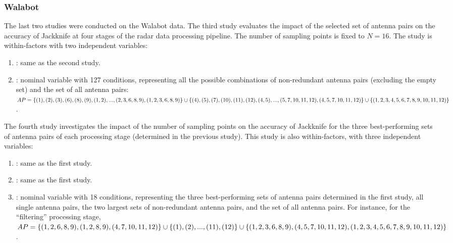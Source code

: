 \subsubsection{Walabot} \label{sec:radar-experiments:sensors:protocol:walabot}
The last two studies were conducted on the Walabot data.
%
The third study evaluates the impact of the selected set of antenna pairs on the accuracy of Jackknife at four stages of the radar data processing pipeline. The number of sampling points is fixed to $N{=}16$. The study is within-factors with two independent variables:
\begin{enumerate}
    \item {}: same as the second study.
    \item {}: nominal variable with 127 conditions, representing all the possible combinations of non-redundant antenna pairs (excluding the empty set) and the set of all antenna pairs: $\splitatcommas{AP=\{(1), (2), (3), (6), (8), (9), (1, 2), ..., (2, 3, 6, 8, 9), (1, 2, 3, 6, 8, 9)\} \cup \{(4), (5), (7), (10), (11), (12), (4, 5), ..., (5, 7, 10, 11, 12), (4, 5, 7, 10, 11, 12)\} \cup \{(1, 2, 3, 4, 5, 6, 7, 8, 9, 10, 11, 12)\}}$.
\end{enumerate}
%
The fourth study investigates the impact of the number of sampling points on the accuracy of Jackknife for the three best-performing sets of antenna pairs of each processing stage (determined in the previous study).
This study is also within-factors, with three independent variables:
\begin{enumerate}
    \item {}: same as the first study.
    \item {}: same as the first study.
    \item {}: nominal variable with 18 conditions, representing the three best-performing sets of antenna pairs determined in the first study, all single antenna pairs, the two largest sets of non-redundant antenna pairs, and the set of all antenna pairs. For instance, for the ``filtering'' processing stage, $\splitatcommas{AP=\{(1, 2, 6, 8, 9), (1, 2, 8, 9), (4, 7, 10, 11, 12)\} \cup \{(1), (2), ..., (11), (12)\} \cup \{(1, 2, 3, 6, 8, 9), (4, 5, 7, 10, 11, 12), (1, 2, 3, 4, 5, 6, 7, 8, 9, 10, 11, 12)\}}$.    
\end{enumerate}
